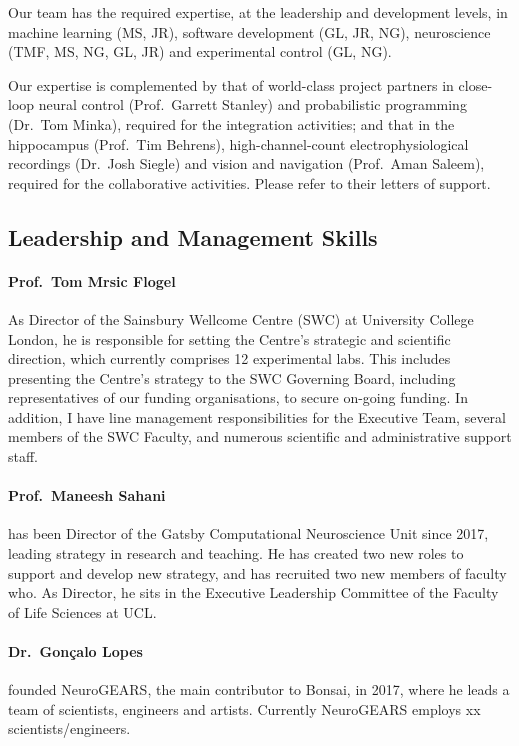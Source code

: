 Our team has the required expertise, at the leadership and development levels,
in machine learning (MS, JR), software development (GL, JR, NG), neuroscience
(TMF, MS, NG, GL, JR) and experimental control (GL, NG).

Our expertise is complemented by that of world-class project partners in
close-loop neural control (Prof.~Garrett Stanley) and probabilistic programming
(Dr.~Tom Minka), required for the integration activities; and that in the
hippocampus (Prof.~Tim Behrens), high-channel-count electrophysiological
recordings (Dr.~Josh Siegle) and vision and navigation (Prof.~Aman Saleem),
required for the collaborative activities. Please refer to their letters of
support.

\subsection*{Leadership and Management Skills}

\paragraph{Prof.~Tom Mrsic Flogel} As Director of the Sainsbury Wellcome Centre
(SWC) at University College London, he is responsible for setting the Centre’s
strategic and scientific direction, which currently comprises 12 experimental
labs. This includes presenting the Centre’s strategy to the SWC Governing
Board, including representatives of our funding organisations, to secure
on-going funding. In addition, I have line management responsibilities for the
Executive Team, several members of the SWC Faculty, and numerous scientific and
administrative support staff.

\paragraph{Prof.~Maneesh Sahani} has been Director of the Gatsby Computational
Neuroscience Unit since 2017, leading strategy in research and teaching. He has
created two new roles to support and develop new strategy, and has recruited
two new members of faculty who.  As Director, he sits in the Executive
Leadership Committee of the Faculty of Life Sciences at UCL.

\paragraph{Dr.~Gon\c{c}alo Lopes} founded NeuroGEARS, the main contributor to
Bonsai, in 2017, where he leads a team of scientists, engineers and artists.
Currently NeuroGEARS employs xx scientists/engineers.

